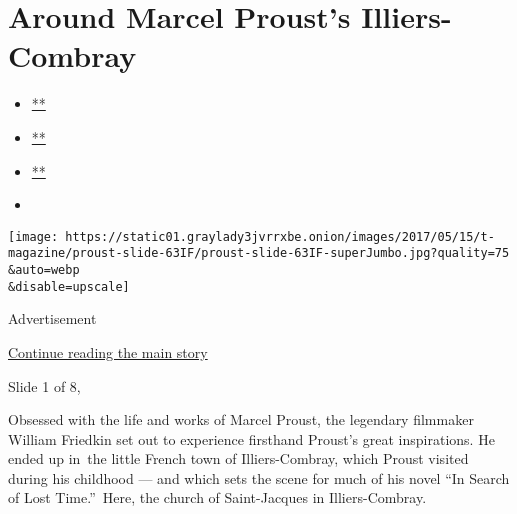\hypertarget{around-marcel-prousts-illiers-combray}{%
\section{Around Marcel Proust's
Illiers-Combray}\label{around-marcel-prousts-illiers-combray}}

\begin{itemize}
\item
  \href{https://www.facebookcorewwwi.onion/sharer.php?app_id=9869919170\&u=https\%3A\%2F\%2Fwww.nytimes3xbfgragh.onion\%2Fslideshow\%2F2017\%2F05\%2F15\%2Ft-magazine\%2Faround-marcel-prousts-illiers-combray.html\%3Fsmid\%3Dfb-share\&name=Around\%20Marcel\%20Proust\%E2\%80\%99s\%20Illiers-Combray\&redirect_uri=https\%3A\%2F\%2Fwww.facebookcorewwwi.onion\%2F}{**}
\item
  \href{https://twitter.com/intent/tweet?url=https\%3A\%2F\%2Fwww.nytimes3xbfgragh.onion\%2Fslideshow\%2F2017\%2F05\%2F15\%2Ft-magazine\%2Faround-marcel-prousts-illiers-combray.html\%3Fsmid\%3Dtw-share\&text=Around\%20Marcel\%20Proust\%E2\%80\%99s\%20Illiers-Combray}{**}
\item
  \href{mailto:?subject=nytimes3xbfgragh.onion\%3A\%20Around\%20Marcel\%20Proust\%E2\%80\%99s\%20Illiers-Combray\&body=From\%20The\%20New\%20York\%20Times\%3A\%0A\%0AAround\%20Marcel\%20Proust\%E2\%80\%99s\%20Illiers-Combray\%0A\%0AA\%20look\%20at\%20the\%20French\%20town\%20that\%20he\%20visited\%20during\%20his\%20childhood\%20\%E2\%80\%94\%20and\%20that\%20inspired\%20his\%20work.\%0A\%0Ahttps\%3A\%2F\%2Fwww.nytimes3xbfgragh.onion\%2Fslideshow\%2F2017\%2F05\%2F15\%2Ft-magazine\%2Faround-marcel-prousts-illiers-combray.html\%3Fsmid\%3Dem-share}{**}
\item
\end{itemize}

\texttt{[image: https://static01.graylady3jvrrxbe.onion/images/2017/05/15/t-magazine/proust-slide-63IF/proust-slide-63IF-superJumbo.jpg?quality=75\\\&auto=webp\\\&disable=upscale]}

Advertisement

\protect\hyperlink{after-right-0}{Continue reading the main story}

Slide 1 of 8,

Obsessed with the life and works of Marcel Proust, the legendary
filmmaker William Friedkin set out to experience firsthand Proust's
great inspirations. He ended up in~the little French town of
Illiers-Combray, which Proust visited during his childhood --- and which
sets the scene for much of his novel ``In Search of Lost Time.''~Here,
the church of Saint-Jacques in Illiers-Combray.

